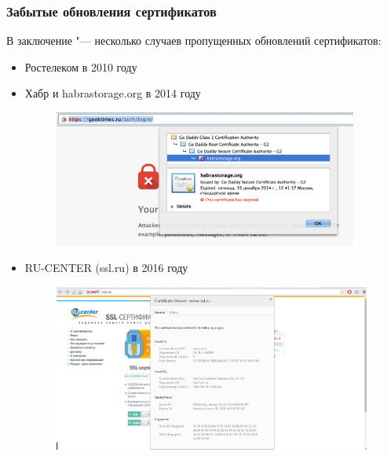 \documentclass[10pt, a5paper]{article}
\begin{document}
\subsubsection*{Забытые обновления сертификатов}

В заключение "--- несколько случаев пропущенных обновлений сертификатов:

\begin{itemize}
  \item Ростелеком в 2010 году ~\cite{Kharkevich7}
  \item Хабр и habrastorage.org в 2014 году ~\cite{Kharkevich8}

\begin{figure}[h!]
  \centering
  \includegraphics[width=10cm]{w_03_2016_Kharkevich12.png}
  
\end{figure}

  \item RU-CENTER (ssl.ru) в 2016 году

\begin{figure}[h!]
  \centering
  \includegraphics[height=5.5cm]{w_03_2016_Kharkevich13.png}
  
\end{figure}

\end{itemize}
\end{document}
